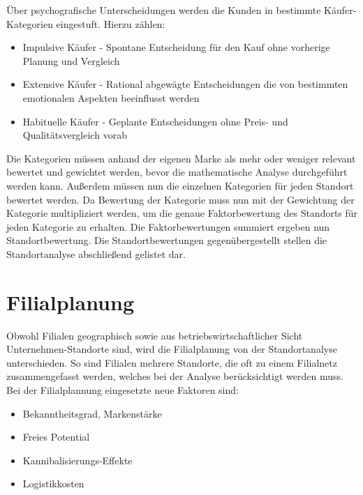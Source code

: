 Über psychografische Unterscheidungen werden die Kunden in bestimmte Käufer-Kategorien eingestuft.
Hierzu zählen:
\begin{itemize}
	\item Impulsive Käufer - Spontane Entscheidung für den Kauf ohne vorherige Planung und Vergleich
	\item Extensive Käufer - Rational abgewägte Entscheidungen die von bestimmten emotionalen Aspekten beeinflusst werden
	\item Habituelle Käufer - Geplante Entscheidungen ohne Preis- und Qualitätsvergleich vorab
\end{itemize}

Die Kategorien müssen anhand der eigenen Marke als mehr oder weniger relevant bewertet und gewichtet werden, bevor die mathematische Analyse durchgeführt werden kann.
Außerdem müssen nun die einzelnen Kategorien für jeden Standort bewertet werden. 
Da Bewertung der Kategorie muss nun mit der Gewichtung der Kategorie multipliziert werden, um die genaue Faktorbewertung des Standorts für jeden Kategorie zu erhalten. Die Faktorbewertungen summiert ergeben nun Standortbewertung. Die Standortbewertungen gegenübergestellt stellen die Standortanalyse abschließend gelistet dar.

\section{Filialplanung}
Obwohl Filialen geographisch sowie aus betriebswirtschaftlicher Sicht Unternehmen-Standorte sind, wird die Filialplanung von der Standortanalyse unterschieden. So sind Filialen mehrere Standorte, die oft zu einem Filialnetz zusammengefasst werden, welches bei der Analyse berücksichtigt werden muss.
Bei der Filialplannung eingesetzte neue Faktoren sind:
\begin{itemize}
	\item Bekanntheitsgrad, Markenstärke
	\item Freies Potential
	\item Kannibalisierungs-Effekte
	\item Logistikkosten
\end{itemize}
